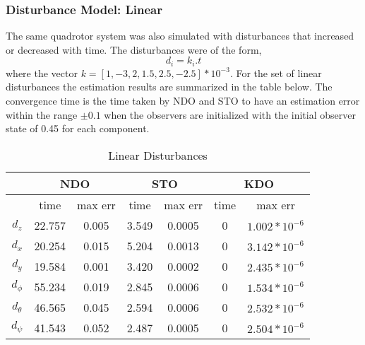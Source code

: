 \documentclass{article}
\begin{document}
\subsubsection{Disturbance Model: Linear}
The same quadrotor system was also simulated with disturbances that increased or decreased with time. The disturbances were of the form, 
\begin{equation}
d_i = k_i.t
\end{equation}
where the vector $k=[1,-3,2,1.5,2.5,-2.5]*10^{-3}$. 
For the set of linear disturbances the estimation results are summarized in the table below. The convergence time is the time taken by NDO and STO to have an estimation error within the range $\pm0.1$ when the observers are initialized with the initial observer state of 0.45 for each component. 
\begin{table}[!htbp]
\centering
\caption{Linear Disturbances}
\begin{tabular}{*7c}
\toprule
{} &  \multicolumn{2}{c}{NDO} & \multicolumn{2}{c}{STO} & \multicolumn{2}{c}{KDO}\\
\midrule
{}        &   time   & max err  & time  & max err& time  & max err\\
$d_z$     &  22.757 & 0.005   & 3.549  & 0.0005 & 0     & $1.002*10^{-6}$\\
$d_x$     &  20.254 & 0.015   & 5.204  & 0.0013 & 0     & $3.142*10^{-6}$\\
$d_y$     &  19.584 & 0.001   & 3.420  & 0.0002 & 0     & $2.435*10^{-6}$\\
$d_\phi$  &  55.234 & 0.019   & 2.845  & 0.0006 & 0     & $1.534*10^{-6}$\\
$d_\theta$&  46.565 & 0.045   & 2.594  & 0.0006 & 0     & $2.532*10^{-6}$\\
$d_\psi$  &  41.543 & 0.052   & 2.487  & 0.0005 & 0     & $2.504*10^{-6}$\\
\bottomrule
\end{tabular}
\end{table}
\end{document}
